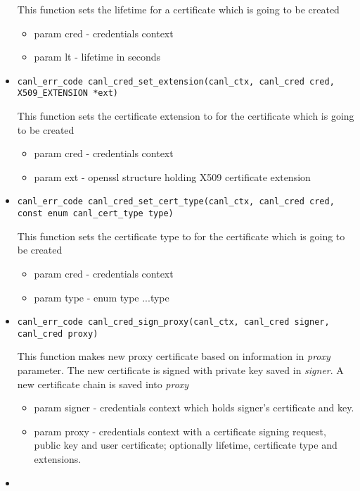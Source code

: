 \begin{itemize}
  This function sets the lifetime for a certificate which is going to 
  be created
  \begin{itemize}
    \item param cred - credentials context
    \item param lt - lifetime in seconds
  \end{itemize}
  \item \begin{verbatim}
canl_err_code canl_cred_set_extension(canl_ctx, canl_cred cred,
X509_EXTENSION *ext)\end{verbatim}
  This function sets the certificate extension to for the certificate 
  which is going to be created
  \begin{itemize}
    \item param cred - credentials context 
    \item param ext - openssl structure holding X509 certificate extension
  \end{itemize}
\item \begin{verbatim}
canl_err_code canl_cred_set_cert_type(canl_ctx, canl_cred cred,
const enum canl_cert_type type)\end{verbatim}
  This function sets the certificate type to for the certificate
  which is going to be created
  \begin{itemize}
    \item param cred - credentials context
    \item param type - \CANL enum type ...\TODO type
  \end{itemize}
  \item \begin{verbatim}
canl_err_code canl_cred_sign_proxy(canl_ctx, canl_cred signer,
canl_cred proxy)\end{verbatim}
  This function makes new proxy certificate based on information in 
  \textit{proxy} parameter. The new certificate is signed with private key 
  saved in \textit{signer}. A new certificate chain is saved 
  into \textit{proxy}
  \begin{itemize}
    \item param signer - credentials context which holds signer's certificate
    and key.
    \item param proxy - credentials context with a certificate 
    signing request, public key and user certificate; optionally lifetime,
    certificate type and extensions.
  \end{itemize}
  \item \begin{verbatim}

\end{verbatim}
\end{itemize}
